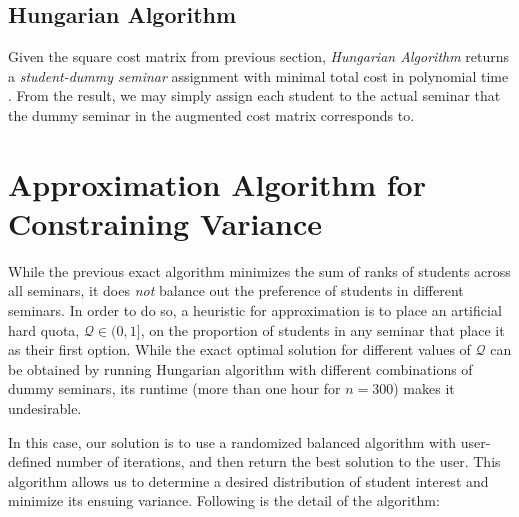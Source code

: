 \documentclass{article} %
\begin{document}
\subsection{Hungarian Algorithm}
    \par\qquad Given the square cost matrix from previous section, \emph{Hungarian Algorithm} returns a \emph{student-dummy seminar} assignment with minimal total cost in polynomial time \cite{mt90}. From the result, we may simply assign each student to the actual seminar that the dummy seminar in the augmented cost matrix corresponds to.

%
%
\section{Approximation Algorithm for Constraining Variance}
    \par\qquad While the previous exact algorithm minimizes the sum of ranks of students across all seminars, it does \emph{not} balance out the preference of students in different seminars. In order to do so, a heuristic for approximation is to place an artificial hard quota, $\mathcal{Q}\in(0,1]$, on the proportion of students in any seminar that place it as their first option. While the exact optimal solution for different values of $\mathcal{Q}$ can be obtained by running Hungarian algorithm with different combinations of dummy seminars, its runtime (more than one hour for $n=300$) makes it undesirable.
    \par\qquad In this case, our solution is to use a randomized balanced algorithm with user-defined number of iterations, and then return the best solution to the user. This algorithm allows us to determine a desired distribution of student interest and minimize its ensuing variance. Following is the detail of the algorithm:
\end{document}
